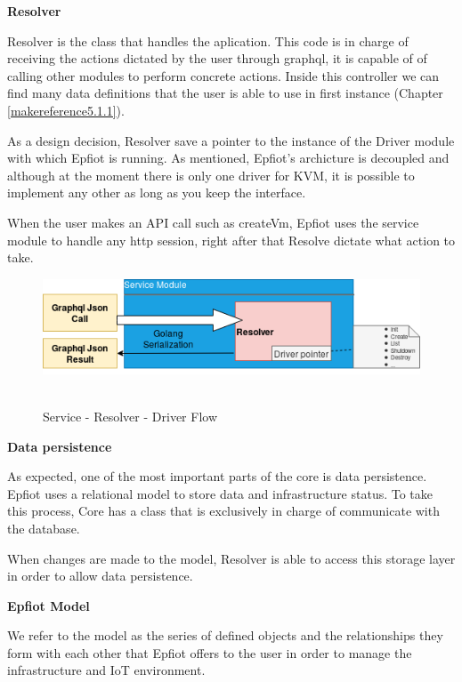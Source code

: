 \textbf{Resolver}

Resolver is the class that handles the aplication. This code is in charge of receiving the actions dictated by the user through graphql, it is capable of of calling other modules to perform concrete actions. Inside this controller we can find many data definitions that the user is able to use in first instance (Chapter \ref{makereference5.1.1}).

As a design decision, Resolver save a pointer to the instance of the Driver module with which Epfiot is running.
As mentioned, Epfiot's archicture is decoupled and although at the moment there is only one driver for KVM, it is possible to implement any other as long as you keep the interface.


When the user makes an API call such as createVm, Epfiot uses the service module to handle any http session, right after that Resolve dictate what action to take.

\begin{figure}[h!]%
\centering
    \includegraphics[width=5.0in]{figures/resolver.png}
~\caption{Service - Resolver - Driver Flow}
\label{figure4.5}
\end{figure}

\textbf{Data persistence}

As expected, one of the most important parts of the core is data persistence. Epfiot uses a relational model to store data and infrastructure status. To take this process, Core has a class that is exclusively in charge of communicate with the database.

When changes are made to the model, Resolver is able to access this storage layer in order to allow data persistence.

\textbf{Epfiot Model}

We refer to the model as the series of defined objects and the relationships they form with each other that Epfiot offers to the user in order to manage the infrastructure and IoT environment.

